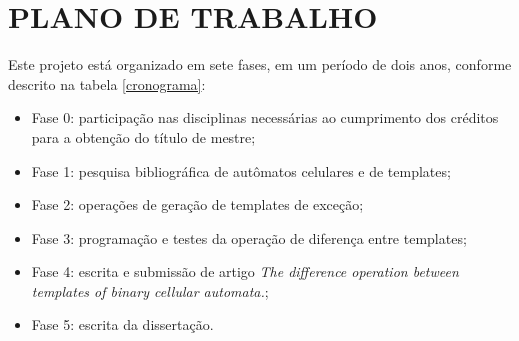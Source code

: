 \section{PLANO DE TRABALHO}
\label{sec:planoDeTrabalho}

Este projeto está organizado em sete fases, em um período de dois anos, conforme descrito na tabela \ref{cronograma}:

  \begin{itemize}
      \item Fase 0: participação nas disciplinas necessárias ao cumprimento dos créditos para a obtenção do título de mestre;
      \item Fase 1: pesquisa bibliográfica de autômatos celulares e de templates;
      \item Fase 2: operações de geração de templates de exceção;
      \item Fase 3: programação e testes da operação de diferença entre templates;
      \item Fase 4: escrita e submissão de artigo \emph{The difference operation between templates of binary cellular automata.};
      \item Fase 5: escrita da dissertação.
  \end{itemize}

\begin{table}[h!]
\centering
\caption{Cronograma de desenvolvimento do projeto}
\label{cronograma}
\end{table}